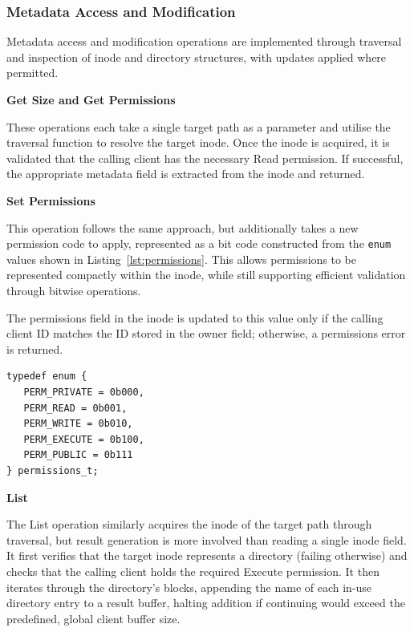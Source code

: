\subsubsection{Metadata Access and Modification}

Metadata access and modification operations are implemented through traversal and inspection of inode and directory structures, with updates applied where permitted.

\textbf{Get Size and Get Permissions}

These operations each take a single target path as a parameter and utilise the traversal function to resolve the target inode. Once the inode is acquired, it is validated that the calling client has the necessary Read permission. If successful, the appropriate metadata field is extracted from the inode and returned.

\textbf{Set Permissions}

This operation follows the same approach, but additionally takes a new permission code to apply, represented as a bit code constructed from the \texttt{enum} values shown in Listing~\ref{lst:permissions}. This allows permissions to be represented compactly within the inode, while still supporting efficient validation through bitwise operations.

The permissions field in the inode is updated to this value only if the calling client ID matches the ID stored in the owner field; otherwise, a permissions error is returned.

\vspace{0.3cm}
\begin{lstlisting}[caption={Permissions bitmask enum.}, label={lst:permissions}]
typedef enum {
   PERM_PRIVATE = 0b000,
   PERM_READ = 0b001,
   PERM_WRITE = 0b010,
   PERM_EXECUTE = 0b100,
   PERM_PUBLIC = 0b111
} permissions_t;
\end{lstlisting}
\vspace{-0.2cm}

\textbf{List} 

The List operation similarly acquires the inode of the target path through traversal, but result generation is more involved than reading a single inode field. It first verifies that the target inode represents a directory (failing otherwise)   and checks that the calling client holds the required Execute permission. It then iterates through the directory’s blocks, appending the name of each in-use directory entry to a result buffer, halting addition if continuing would exceed the predefined, global client buffer size. 

